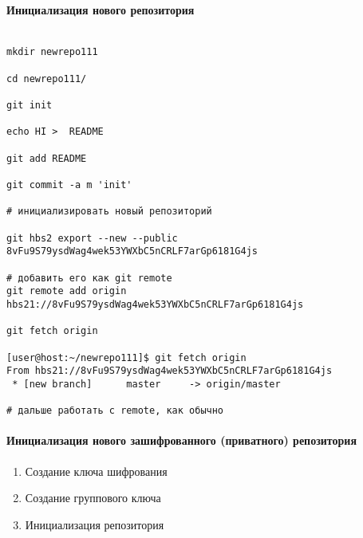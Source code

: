 \documentclass[11pt,a4paper]{article}
\begin{document}
\paragraph{Инициализация нового репозитория}

\begin{verbatim}

mkdir newrepo111

cd newrepo111/

git init

echo HI >  README

git add README

git commit -a m 'init'

# инициализировать новый репозиторий

git hbs2 export --new --public 8vFu9S79ysdWag4wek53YWXbC5nCRLF7arGp6181G4js

# добавить его как git remote
git remote add origin hbs21://8vFu9S79ysdWag4wek53YWXbC5nCRLF7arGp6181G4js

git fetch origin

[user@host:~/newrepo111]$ git fetch origin
From hbs21://8vFu9S79ysdWag4wek53YWXbC5nCRLF7arGp6181G4js
 * [new branch]      master     -> origin/master

# дальше работать с remote, как обычно

\end{verbatim}

\paragraph{Инициализация нового зашифрованного (приватного) репозитория}

\begin{enumerate}
  \item Создание ключа шифрования
  \item Создание группового ключа
  \item Инициализация репозитория
\end{enumerate}
\end{document}
